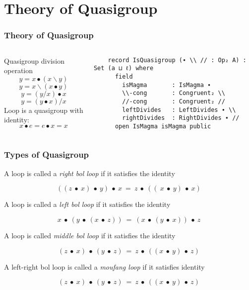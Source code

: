 \documentclass[xcolor={dvipsnames}]{beamer}
\begin{document}
\section{Theory of Quasigroup}

\begin{frame}[fragile]
  \frametitle{Theory of Quasigroup}  
  \begin{columns}
    \begin{column}{0.4\textwidth}
        Quasigroup division operation
            \[y=x∙(x\backslash y)\]
            \[y=x\backslash(x∙y)\]
            \[y=(y/x)∙x\]
            \[y=(y∙x)/x\]
      Loop is a quasigroup with identity:
      \[x∙e=e∙x=x\]
    \end{column}
    \hfill
    \begin{column}{0.575\textwidth}
\begin{verbatim}
    record IsQuasigroup (∙ \\ // : Op₂ A) : Set (a ⊔ ℓ) where
      field
        isMagma       : IsMagma ∙
        \\-cong       : Congruent₂ \\
        //-cong       : Congruent₂ //
        leftDivides   : LeftDivides ∙ \\
        rightDivides  : RightDivides ∙ //
      open IsMagma isMagma public
\end{verbatim}
    \end{column}
  \end{columns}
\end{frame}

\begin{frame}[fragile]
  \frametitle{Types of Quasigroup}

  A loop is called a \textit{right bol loop} if it satisfies the identity

   \[((z\ ∙\ x)\ ∙\ y)\ ∙\ x\ =\ z\ ∙\ ((\ x\ ∙\ y)\ ∙\ x)\]

  A loop is called a \textit{left bol loop} if it satisfies the identity

   \[x\ ∙\ (y\ ∙\ (x\ ∙\ z))\ =\ (x\ ∙\ (y\ ∙\ x))\ ∙\ z\]

  A loop is called \textit{middle bol loop} if it satisfies the identity

  \[(z\ ∙\ x)\ ∙\ (y\ ∙\ z)\ =\ z\ ∙\ ((x\ ∙\ y)\ ∙\ z)\]

  A left-right bol loop is called a \textit{moufang loop} if it satisfies identity

  \[(z\ ∙\ x)\ ∙\ (y\ ∙\ z)\ =\ z\ ∙\ ((x\ ∙\ y)\ ∙\ z)\]

\end{frame}
\end{document}
